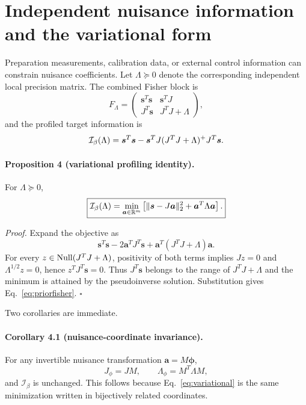 \section{Independent nuisance information and the variational form}
\label{sec:prior}

Preparation measurements, calibration data, or external control information can constrain nuisance coefficients. Let $\Lambda\succeq0$ denote the corresponding independent local precision matrix. The combined Fisher block is
\begin{equation}
F_\Lambda=\begin{pmatrix}
\bm s^T\bm s & \bm s^T J\\
J^T\bm s & J^T J+\Lambda
\end{pmatrix},
\end{equation}
and the profiled target information is
\begin{equation}
 \mathcal I_{\beta}(\Lambda)=\bm s^T\bm s-
 \bm s^T J(J^TJ+\Lambda)^+J^T\bm s.
\label{eq:priorfisher}
\end{equation}

\paragraph*{Proposition 4 (variational profiling identity).}
For $\Lambda\succeq0$,
\begin{equation}
 \boxed{\displaystyle
 \mathcal I_{\beta}(\Lambda)=\min_{\bm a\in\mathbb R^m}
 \left[\|\bm s-J\bm a\|_2^2+\bm a^T\Lambda\bm a\right].}
\label{eq:variational}
\end{equation}

\emph{Proof.} Expand the objective as
\begin{equation}
 \bm s^T\bm s-2\bm a^TJ^T\bm s
 +\bm a^T(J^TJ+\Lambda)\bm a.
\end{equation}
For every $z\in\operatorname{Null}(J^TJ+\Lambda)$, positivity of both terms implies $Jz=0$ and $\Lambda^{1/2}z=0$, hence $z^TJ^T\bm s=0$. Thus $J^T\bm s$ belongs to the range of $J^TJ+\Lambda$ and the minimum is attained by the pseudoinverse solution. Substitution gives Eq.~\eqref{eq:priorfisher}. \hfill$\square$

Two corollaries are immediate.

\paragraph*{Corollary 4.1 (nuisance-coordinate invariance).}
For any invertible nuisance transformation $\bm a=M\bm\phi$,
\begin{equation}
 J_\phi=JM,\qquad \Lambda_\phi=M^T\Lambda M,
\end{equation}
and $\mathcal I_\beta$ is unchanged. This follows because Eq.~\eqref{eq:variational} is the same minimization written in bijectively related coordinates.

